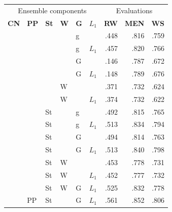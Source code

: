 \documentclass[11pt,letterpaper]{article}
\begin{document}
\begin{table}[t]
\centering
\footnotesize
\begin{tabular}{llllll|rrr}
\toprule
\multicolumn{6}{c|}{Ensemble components} & \multicolumn{3}{c}{Evaluations} \\
\bf CN&\bf PP&\bf St&\bf W& \bf G& $L_1$  & \bf RW  & \bf MEN & \bf  WS \\
\midrule
     &      &      &      & g    &        &    .448 &    .816 &    .759 \\  %
     &      &      &      & g    & $L_1$  &    .457 &    .820 &    .766 \\  %
     &      &      &      & G    &        &    .146 &    .787 &    .672 \\  %
     &      &      &      & G    & $L_1$  &    .148 &    .789 &    .676 \\  %
     &      &      & W    &      &        &    .371 &    .732 &    .624 \\  %
     &      &      & W    &      & $L_1$  &    .374 &    .732 &    .622 \\  %
\midrule
     &      & St   &      & g    &        &    .492 &    .815 &    .765 \\  %
     &      & St   &      & g    & $L_1$  &    .513 &    .834 &    .794 \\  %
     &      & St   &      & G    &        &    .494 &    .814 &    .763 \\  %
     &      & St   &      & G    & $L_1$  &    .513 &    .840 &    .798 \\  %
     &      & St   & W    &      &        &    .453 &    .778 &    .731 \\  %
     &      & St   & W    &      & $L_1$  &    .452 &    .777 &    .732 \\  %
     &      & St   & W    & G    & $L_1$  &    .525 &    .832 &    .778 \\  %
\midrule
     & PP   & St   &      & G    & $L_1$  &    .561 &    .852 &    .806 \\  %

\end{tabular}
\end{table}
\end{document}
